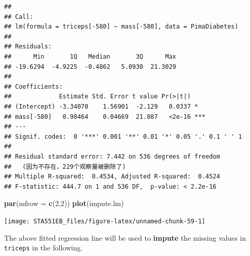 \documentclass[
]{book}
\newenvironment{Shaded}{\begin{snugshade}}{\end{snugshade}}
\newcommand{\AttributeTok}[1]{\textcolor[rgb]{0.13,0.29,0.53}{#1}}
\newcommand{\ConstantTok}[1]{\textcolor[rgb]{0.56,0.35,0.01}{#1}}
\newcommand{\ControlFlowTok}[1]{\textcolor[rgb]{0.13,0.29,0.53}{\textbf{#1}}}
\newcommand{\DecValTok}[1]{\textcolor[rgb]{0.00,0.00,0.81}{#1}}
\newcommand{\FunctionTok}[1]{\textcolor[rgb]{0.13,0.29,0.53}{\textbf{#1}}}
\newcommand{\NormalTok}[1]{#1}
\newcommand{\OtherTok}[1]{\textcolor[rgb]{0.56,0.35,0.01}{#1}}
\newcommand{\SpecialCharTok}[1]{\textcolor[rgb]{0.81,0.36,0.00}{\textbf{#1}}}
\begin{document}
\begin{verbatim}
## 
## Call:
## lm(formula = triceps[-580] ~ mass[-580], data = PimaDiabetes)
## 
## Residuals:
##      Min       1Q   Median       3Q      Max 
## -19.6294  -4.9225  -0.4862   5.0930  21.3029 
## 
## Coefficients:
##             Estimate Std. Error t value Pr(>|t|)    
## (Intercept) -3.34070    1.56901  -2.129   0.0337 *  
## mass[-580]   0.98464    0.04669  21.087   <2e-16 ***
## ---
## Signif. codes:  0 '***' 0.001 '**' 0.01 '*' 0.05 '.' 0.1 ' ' 1
## 
## Residual standard error: 7.442 on 536 degrees of freedom
##   (因为不存在，229个观察量被删除了)
## Multiple R-squared:  0.4534, Adjusted R-squared:  0.4524 
## F-statistic: 444.7 on 1 and 536 DF,  p-value: < 2.2e-16
\end{verbatim}

\begin{Shaded}
\begin{Highlighting}[]
\FunctionTok{par}\NormalTok{(}\AttributeTok{mfrow =} \FunctionTok{c}\NormalTok{(}\DecValTok{2}\NormalTok{,}\DecValTok{2}\NormalTok{))}
\FunctionTok{plot}\NormalTok{(impute.lm)}
\end{Highlighting}
\end{Shaded}

\begin{center}\texttt{[image: STA551EB\_files/figure-latex/unnamed-chunk-59-1]} \end{center}

The above fitted regression line will be used to \textbf{impute} the missing values in \texttt{triceps} in the following.

\begin{Shaded}
\end{Shaded}
\end{document}
